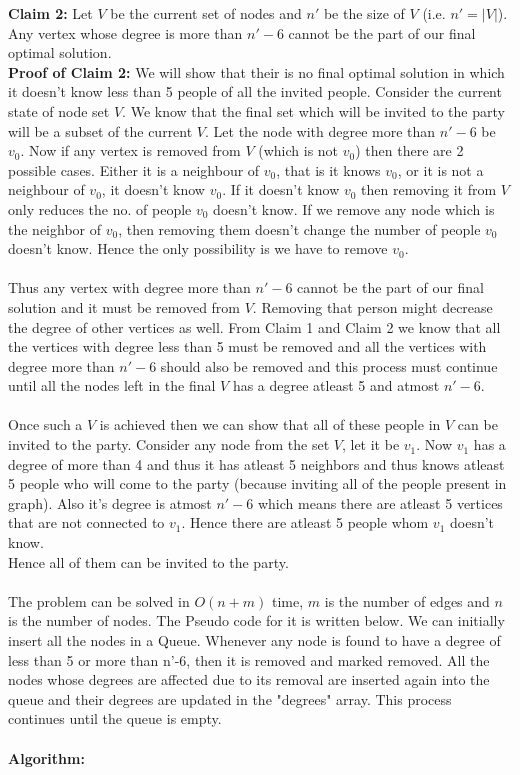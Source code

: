 \documentclass{article}
\begin{document}
\textbf{Claim 2:} Let $V$ be the current set of nodes and $n'$ be the size of $V$ (i.e. $n'= |V|$). Any vertex whose degree is more than $n'-6$ cannot be the part of our final optimal solution.\\
\textbf{Proof of Claim 2:} We will show that their is no final optimal solution in which it doesn't know less than 5 people of all the invited people. Consider the current state of node set $V$. We know that the final set which will be invited to the party will be a subset of the current $V$. Let the node with degree more than $n'-6$ be $v_0$. Now if any vertex is removed from $V$ (which is not $v_0$) then there are 2 possible cases. Either it is a neighbour of $v_0$, that is it knows $v_0$, or it is not a neighbour of $v_0$, it doesn't know $v_0$. If it doesn't know $v_0$ then removing it from $V$ only reduces the no. of people $v_0$ doesn't know. If we remove any node which is the neighbor of $v_0$, then removing them doesn't change the number of people $v_0$ doesn't know. Hence the only possibility is we have to remove $v_0$.
\\\\
Thus any vertex with degree more than $n'-6$ cannot be the part of our final solution and it must be removed from $V$. Removing that person might decrease the degree of other vertices as well. From Claim 1 and Claim 2 we know that all the vertices with degree less than 5 must be removed and all the vertices with degree more than $n'-6$ should also be removed and this process must continue until all the nodes left in the final $V$ has a degree atleast 5 and atmost $n'-6$. 
\\\\
Once such a $V$ is achieved then we can show that all of these people in $V$ can be invited to the party. Consider any node from the set $V$, let it be $v_1$. Now $v_1$ has a degree of more than 4 and thus it has atleast 5 neighbors and thus knows atleast 5 people who will come to the party (because inviting all of the people present in graph). Also it's degree is atmost $n'-6$ which means there are atleast 5 vertices that are not connected to $v_1$. Hence there are atleast 5 people whom $v_1$ doesn't know.\\Hence all of them can be invited to the party.
\\\\
The problem can be solved in $O(n+m)$ time, $m$ is the number of edges and $n$ is the number of nodes. The Pseudo code for it is written below. We can initially insert all the nodes in a Queue. Whenever any node is found to have a degree of less than 5 or more than n'-6, then it is removed and marked removed. All the nodes whose degrees are affected due to its removal are inserted again into the queue and their degrees are updated in the "degrees" array. This process continues until the queue is empty.
\\\\
\textbf{Algorithm:}

\end{document}
